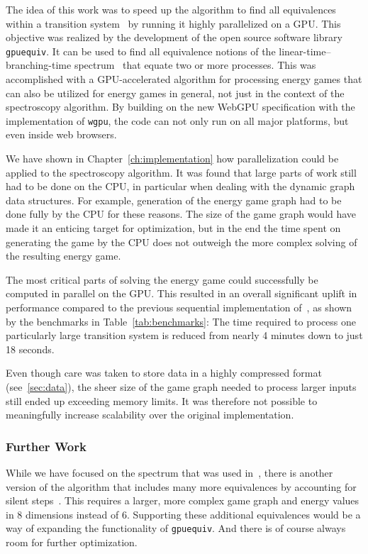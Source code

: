 The idea of this work was to speed up the algorithm to find all equivalences
within a transition system~\cite{bisping2023process} by running it highly
parallelized on a GPU\@.
This objective was realized by the development of the open source software
library \texttt{gpuequiv}.
It can be used to find all equivalence notions of the
linear-time--branching-time spectrum~\cite{glabbeek1990spectrum}
that equate two or more processes.
This was accomplished with a GPU-accelerated algorithm for processing energy
games that can also be utilized for energy games in general,
not just in the context of the spectroscopy algorithm.
By building on the new WebGPU specification with the implementation of
\texttt{wgpu},
the code can not only run on all major platforms,
but even inside web browsers.

We have shown in Chapter~\ref{ch:implementation} how parallelization could be
applied to the spectroscopy algorithm.
It was found that large parts of work still had to be done on the CPU,
in particular when dealing with the dynamic graph data structures.
For example, generation of the energy game graph had to be done
fully by the CPU for these reasons.
The size of the game graph would have made it an enticing target for
optimization,
but in the end the time spent on generating the game by the CPU does not
outweigh the more complex solving of the resulting energy game.

The most critical parts of solving the energy game could successfully be
computed in parallel on the GPU\@.
This resulted in an overall significant uplift in performance compared to the
previous sequential implementation of~\cite{bisping2023process},
as shown by the benchmarks in Table~\ref{tab:benchmarks}:
The time required to process one particularly large transition system is
reduced from nearly 4 minutes down to just 18 seconds.

Even though care was taken to store data in a highly compressed format
(see~\ref{sec:data}),
the sheer size of the game graph needed to process larger inputs still
ended up exceeding memory limits.
It was therefore not possible to meaningfully increase scalability
over the original implementation.

\subsubsection{Further Work}

While we have focused on the spectrum that was used
in~\cite{bisping2023process},
there is another version of the algorithm that includes many more equivalences
by accounting for silent steps~\cite{bisping2023silent}.
This requires a larger,
more complex game graph and energy values in 8 dimensions instead of 6.
Supporting these additional equivalences would be a way of expanding the
functionality of \texttt{gpuequiv}.
And there is of course always room for further optimization.
